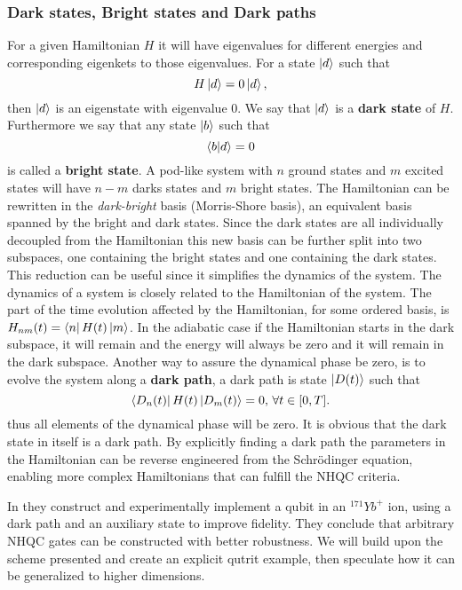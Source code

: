 \subsubsection{Dark states, Bright states and Dark paths}
For a given Hamiltonian $H$ it will have eigenvalues for different energies and corresponding eigenkets to those eigenvalues. For a state $\ket{d}$ such that 
\begin{equation}
H\ket{d} = 0\ket{d},
\end{equation}
then $\ket{d}$ is an eigenstate with eigenvalue $0$. We say that $\ket{d}$ is a \textbf{dark state} of $H$. Furthermore we say that any state $\ket{b}$ such that 
\begin{equation}
\bra{b}\ket{d} = 0
\end{equation}
is called a \textbf{bright state}. A pod-like system with $n$ ground states and $m$ excited states will have $n-m$ darks states and $m$ bright states\cite{lambda}.
The Hamiltonian can be rewritten in the \textit{dark-bright} basis (Morris-Shore basis), an equivalent basis spanned by the bright and dark states. Since the dark states are all individually decoupled from the Hamiltonian this new basis can be further split into two subspaces, one containing the bright states and one containing the dark states. This reduction can be useful since it simplifies the dynamics of the system. 
The dynamics of a system is closely related to the Hamiltonian of the system. The part of the time evolution affected by the Hamiltonian, for some ordered basis, is $H_{nm}(t) = \bra{n}H(t)\ket{m}$. In the adiabatic case if the Hamiltonian starts in the dark subspace, it will remain and the energy will always be zero and it will remain in the dark subspace. Another way to assure the dynamical phase be zero, is to evolve the system along a \textbf{dark path}, a dark path is state $\ket{D(t)}$ such that 
\begin{equation}
\bra{D_n(t)}H(t)\ket{D_m(t)} = 0, \, \forall t\in[0,T].
\end{equation}
thus all elements of the dynamical phase will be zero. It is obvious that the dark state in itself is a dark path. By explicitly finding a dark path the parameters in the Hamiltonian can be reverse engineered from the Schrödinger equation, enabling more complex Hamiltonians that can fulfill the NHQC criteria.

In \cite{darkpath} they construct and experimentally implement a qubit in an $^{171}Yb^{+}$ ion, using a dark path and an auxiliary state to improve fidelity. They conclude that arbitrary NHQC gates can be constructed with better robustness. We will build upon the scheme presented and create an explicit qutrit example, then speculate how it can be generalized to higher dimensions.
